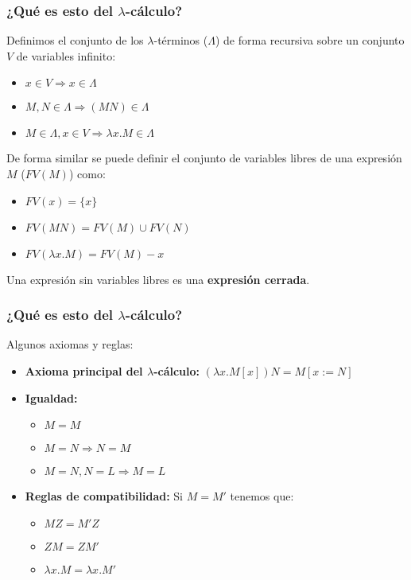 \documentclass[spanish, a4paper, 12pt, final, slideColor, nototal, colorBG, pdf, noaccumulate, darkblue] {beamer}
\begin{document}
\begin{frame}
    \frametitle{¿Qué es esto del $\lambda$-cálculo?}
    Definimos el conjunto de los $\lambda$-términos ($\Lambda$) de forma recursiva sobre un conjunto $V$ de variables infinito:
    \begin{itemize}
        \item $x \in V \Rightarrow x \in \Lambda$
        \item $M, N \in \Lambda \Rightarrow (MN)\in \Lambda$
        \item $M \in \Lambda, x \in V \Rightarrow \lambda x.M \in \Lambda$
    \end{itemize}
    De forma similar se puede definir el conjunto de variables libres de una expresión $M$ ($FV(M)$) como:
    \begin{itemize}
        \item $FV(x) = \{x\}$
        \item $FV(MN) = FV(M) \cup FV(N)$
        \item $FV(\lambda x.M) = FV(M) - {x}$
    \end{itemize}%
    Una expresión sin variables libres es una \textbf{expresión cerrada}.
\end{frame}
\begin{frame}
    \frametitle{¿Qué es esto del $\lambda$-cálculo?}
    Algunos axiomas y reglas:
    \begin{itemize}
        \item \textbf{Axioma principal del $\lambda$-cálculo: }$(\lambda x.M[x])N = M[x := N]$
        \item \textbf{Igualdad: }
        \begin{itemize}
            \item $M = M$
            \item $M = N \Rightarrow N = M$
            \item $M = N, N = L \Rightarrow M = L$
        \end{itemize}
        \item \textbf{Reglas de compatibilidad: } Si $M = M'$ tenemos que:
        \begin{itemize}
            \item $MZ = M'Z$
            \item $ZM = ZM'$
            \item $\lambda x.M = \lambda x.M'$
        \end{itemize}
    \end{itemize}
\end{frame}
\end{document}
